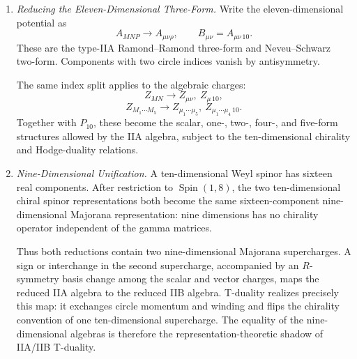 \begin{enumerate}
\begin{enumerate}
      Type IIB instead has two real Weyl supercharges of the same
      ten-dimensional chirality.  An ordinary circle reduction cannot
      change the algebraic fact that a single eleven-dimensional spinor
      decomposes into opposite chiralities.  Thus it yields IIA, not IIB.
      IIB is related after a further compactification by T-duality, which
      reverses one right-moving spacetime chirality.
    \item \emph{Reducing the Eleven-Dimensional Three-Form.}
    Write the eleven-dimensional potential as
      \[
        A_{MNP}\longrightarrow
          A_{\mu\nu\rho},\qquad
          B_{\mu\nu}=A_{\mu\nu\,10}.
      \]
      These are the type-IIA Ramond--Ramond three-form and
      Neveu--Schwarz two-form.  Components with two circle indices vanish
      by antisymmetry.

      The same index split applies to the algebraic charges:
      \[
        Z_{MN}\longrightarrow Z_{\mu\nu},\ Z_{\mu\,10},
      \]
      \[
        Z_{M_1\cdots M_5}\longrightarrow
          Z_{\mu_1\cdots\mu_5},\
          Z_{\mu_1\cdots\mu_4\,10}.
      \]
      Together with \(P_{10}\), these become the scalar, one-, two-,
      four-, and five-form structures allowed by the IIA algebra, subject
      to the ten-dimensional chirality and Hodge-duality relations.
    \item \emph{Nine-Dimensional Unification.}
    A ten-dimensional Weyl spinor has sixteen real components.  After
      restriction to \(\operatorname{Spin}(1,8)\), the two
      ten-dimensional chiral spinor
      representations both become the same sixteen-component
      nine-dimensional Majorana representation: nine dimensions has no
      chirality operator independent of the gamma matrices.

      Thus both reductions contain two nine-dimensional Majorana
      supercharges.  A sign or interchange in the second supercharge,
      accompanied by an \(R\)-symmetry basis change among the scalar and
      vector charges, maps the reduced IIA algebra to the reduced IIB
      algebra.  T-duality realizes precisely this map: it exchanges circle
      momentum and winding and flips the chirality convention of one
      ten-dimensional supercharge.  The equality of the nine-dimensional
      algebras is therefore the representation-theoretic shadow of
      IIA/IIB T-duality.
  \end{enumerate}


\end{enumerate}
